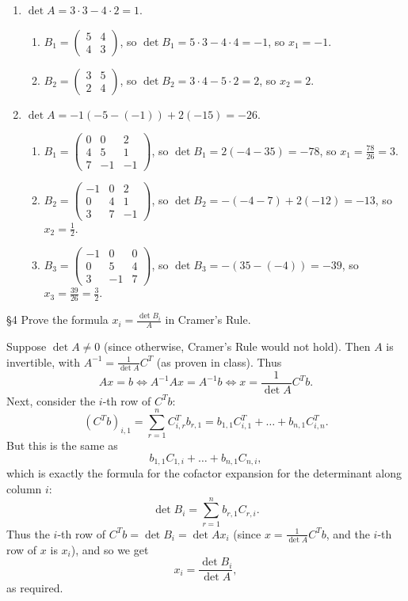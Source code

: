 \documentclass{homework}
\begin{document}
\begin{solution}
  \begin{enumerate}[label=(\alph*)]
    \item $\det{A}=3\cdot 3-4\cdot 2=1$. 
      \begin{enumerate}
        \item $B_1=\begin{pmatrix} 5&4\\4&3 \end{pmatrix} $, so $\det{B_1}=5\cdot 3-4\cdot 4=-1$, so
          $x_1=-1$.
        \item $B_2=\begin{pmatrix} 3&5\\2&4 \end{pmatrix} $, so $\det{B_2}=3\cdot 4-5\cdot 2=2$, so
          $x_2=2$.
      \end{enumerate}
    \item $\det{A}=-1(-5-(-1))+2(-15)=-26$.
      \begin{enumerate}
        \item $B_1=\begin{pmatrix} 0&0&2\\4&5&1\\7&-1&-1 \end{pmatrix} $, so
          $\det{B_1}=2(-4-35)=-78$, so $x_1=\frac{78}{26}=3$.
        \item $B_2=\begin{pmatrix} -1&0&2\\0&4&1\\3&7&-1 \end{pmatrix} $, so
          $\det{B_2}=-(-4-7)+2(-12)=-13$, so $x_2=\frac{1}{2}$.
        \item $B_3=\begin{pmatrix} -1&0&0\\0&5&4\\3&-1&7 \end{pmatrix} $, so
          $\det{B_3}=-(35-(-4))=-39$, so $x_3=\frac{39}{26}=\frac{3}{2}$.
      \end{enumerate}
  \end{enumerate}
\end{solution}

\begin{problem}{\S 4}
  Prove the formula $x_i=\frac{\det{B_i}}{A}$ in Cramer's Rule.
\end{problem}
\begin{solution}
  Suppose $\det{A}\neq 0$ (since otherwise, Cramer's Rule would not hold). Then $A$ is invertible,
  with $A^{-1}=\frac{1}{\det{A}}C^T$ (as proven in class). Thus \[
    Ax=b\iff A^{-1}Ax=A^{-1}b\iff x=\frac{1}{\det{A}}C^Tb
  .\] Next, consider the $i$-th row of $C^Tb$: \[
    (C^Tb)_{i,1}=\sum_{r=1}^{n} C^T_{i,r}b_{r,1}=b_{1,1}C^T_{i,1}+\ldots+b_{n,1}C^T_{i,n}
  .\] But this is the same as \[
    b_{1,1}C_{1,i}+\ldots+b_{n,1}C_{n,i}
  ,\] which is exactly the formula for the cofactor expansion for the determinant along column $i$: \[
    \det{B_i}=\sum_{r=1}^{n} b_{r,1}C_{r,i}
  .\] Thus the $i$-th row of $C^Tb=\det{B_i}=\det{A}x_i$ (since $x=\frac{1}{\det{A}}C^Tb$, and the $i$-th row of $x$ is
  $x_i$), and so we get \[
    x_i = \frac{\det{B_i}}{\det{A}}
  ,\] as required.
\end{solution}
\end{document}
